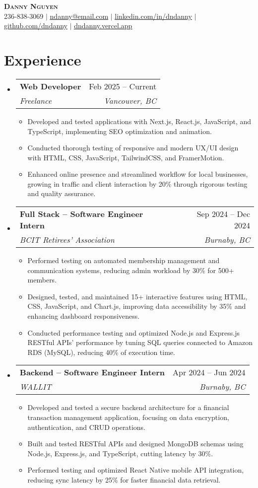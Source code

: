 \documentclass[letterpaper,11pt]{article}
\makeatletter
\newcommand{\resumeItem}[1]{
\item\small{
{#1 \vspace{-2pt}}
}
}
\newcommand{\resumeSubheading}[4]{
\vspace{-2pt}\item
\begin{tabular*}{0.97\textwidth}[t]{l@{\extracolsep{\fill}}r}
\textbf{#1} & #2 \\
\textit{\small#3} & \textit{\small #4} \\
\end{tabular*}\vspace{-7pt}
}
\newcommand{\resumeSubHeadingListStart}{\begin{itemize}[leftmargin=0.15in, label={}]}
\newcommand{\resumeSubHeadingListEnd}{\end{itemize}}
\newcommand{\resumeItemListStart}{\begin{itemize}}
\newcommand{\resumeItemListEnd}{\end{itemize}\vspace{-5pt}}
\makeatother
\begin{document}
\pagecolor{black}
\color{white}

\begin{center}
\textbf{\Huge \scshape Danny Nguyen} \\ \vspace{1pt}
\small 236-838-3069 $|$ \href{mailto:ndanny@email.com}{\underline{ndanny@email.com}} $|$
\href{https://linkedin.com/in/dndanny}{\underline{linkedin.com/in/dndanny}} $|$
\href{https://github.com/dndanny}{\underline{github.com/dndanny}} $|$
\href{https://dndanny.vercel.app}{\underline{dndanny.vercel.app}}
\end{center}


\section{Experience}
\resumeSubHeadingListStart
\resumeSubheading{Web Developer}{Feb 2025 – Current}{Freelance}{Vancouver, BC}
\resumeItemListStart
\resumeItem{Developed and tested applications with Next.js, React.js, JavaScript, and TypeScript, implementing SEO optimization and animation.}
\resumeItem{Conducted thorough testing of responsive and modern UX/UI design with HTML, CSS, JavaScript, TailwindCSS, and FramerMotion.}
\resumeItem{Enhanced online presence and streamlined workflow for local businesses, growing in traffic and client interaction by 20\% through rigorous testing and quality assurance.}
\resumeItemListEnd

\resumeSubheading{Full Stack – Software Engineer Intern}{Sep 2024 – Dec 2024}{BCIT Retirees’ Association}{Burnaby, BC}
\resumeItemListStart
\resumeItem{Performed testing on automated membership management and communication systems, reducing admin workload by 30\% for 500+ members.}
\resumeItem{Designed, tested, and maintained 15+ interactive features using HTML, CSS, JavaScript, and Chart.js, improving data accessibility by 35\% and enhancing dashboard responsiveness.}
\resumeItem{Conducted performance testing and optimized Node.js and Express.js RESTful APIs’ performance by tuning SQL queries connected to Amazon RDS (MySQL), reducing 40\% of execution time.}
\resumeItemListEnd

\resumeSubheading{Backend – Software Engineer Intern}{Apr 2024 – Jun 2024}{WALLIT}{Burnaby, BC}
\resumeItemListStart
\resumeItem{Developed and tested a secure backend architecture for a financial transaction management application, focusing on data encryption, authentication, and CRUD operations.}
\resumeItem{Built and tested RESTful APIs and designed MongoDB schemas using Node.js, Express.js, and TypeScript, cutting latency by 30\%.}
\resumeItem{Performed testing and optimized React Native mobile API integration, reducing sync latency by 25\% for faster financial data retrieval.}
\resumeItemListEnd
\resumeSubHeadingListEnd
\end{document}
